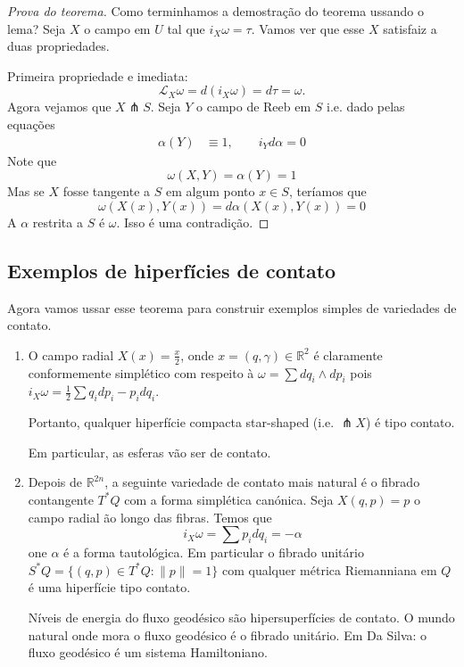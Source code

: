 \begin{proof}[Prova do teorema]
{\color{7}Como terminhamos a demostração do teorema ussando o lema?} Seja $X$ o campo em $U$ tal que $i_X\omega=\tau$. Vamos ver que esse $X$ satisfaiz a duas propriedades.

Primeira propriedade e imediata:
\[\mathcal{L}_X\omega=d(i_X\omega)=d\tau=\omega.\]
Agora vejamos que $X\pitchfork S$. Seja  $Y$ o campo de Reeb em $S$ i.e. dado pelas equações
\begin{align*}
	\alpha(Y)&\equiv 1,\qquad  i_Yd\alpha=0
\end{align*}
Note que
\[\omega(X,Y)=\alpha(Y)=1\]
Mas se $X$ fosse tangente a $S$ em algum ponto $x\in S$, teríamos que
\[\omega(X(x),Y(x))=d\alpha(X(x),Y(x))=0\]
{\color{3}A $\alpha$ restrita a $S$  é $\omega$.} Isso é uma contradição.
\end{proof}

\subsection{Exemplos de hiperfícies de contato}

Agora vamos ussar esse teorema para construir exemplos simples de variedades de contato.	

\begin{enumerate}
	\item O campo radial $X(x)=\frac{x}{2}$, onde $x=(q,\gamma)\in\mathbb{R}^{2}$ é claramente conformemente simplético com respeito à $\omega=\sum dq_i\wedge dp_i$ pois $i_X\omega=\frac{1}{2}\sum q_idp_i-p_idq_i$.

	{\color{3}Portanto, qualquer hiperfície compacta star-shaped (i.e. $\pitchfork X$) é tipo contato.}

	Em particular, as esferas vão ser de contato.

	\item Depois de $\mathbb{R}^{2n}$, a seguinte variedade de contato mais natural é o fibrado contangente $T^*Q$ com a forma simplética canónica. Seja $X(q,p)=p$ o campo radial  ão longo das fibras. Temos que
		\[i_X\omega=\sum p_idq_i=-\alpha\]
		one $\alpha$ é a forma tautológica. Em particular o fibrado unitário $S^*Q=\{(q,p)\in T^* Q:\|p\|=1\}$ com qualquer métrica Riemanniana em $Q$ é uma hiperfície tipo contato.

		{\color{3}Níveis de energia do fluxo geodésico são hipersuperfícies de contato. O mundo natural onde mora o fluxo geodésico é o fibrado unitário. Em Da Silva: o fluxo geodésico é um sistema Hamiltoniano.}
\end{enumerate}



